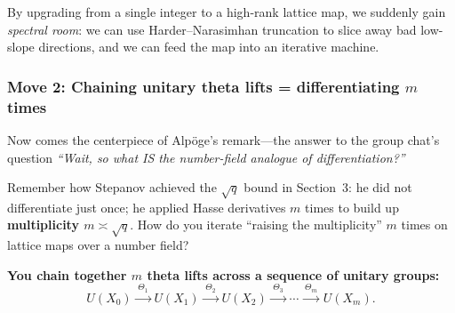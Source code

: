 By upgrading from a single integer to a high-rank lattice map, we suddenly gain \emph{spectral room}: we can use Harder--Narasimhan truncation to slice away bad low-slope directions, and we can feed the map into an iterative machine.

\subsubsection*{Move 2: Chaining unitary theta lifts = differentiating \(m\) times}

Now comes the centerpiece of Alp\"oge's remark---the answer to the group chat's question \emph{``Wait, so what IS the number-field analogue of differentiation?''}

Remember how Stepanov achieved the \(\sqrt{q}\) bound in Section~3: he did not differentiate just once; he applied Hasse derivatives \(m\) times to build up \textbf{multiplicity \(m \asymp \sqrt{q}\)}. How do you iterate ``raising the multiplicity'' \(m\) times on lattice maps over a number field?

\textbf{You chain together \(m\) theta lifts across a sequence of unitary groups:}
\begin{equation}
  U(X_0) \xrightarrow{\;\Theta_1\;} U(X_1) \xrightarrow{\;\Theta_2\;} U(X_2) \xrightarrow{\;\Theta_3\;} \cdots \xrightarrow{\;\Theta_m\;} U(X_m).
  \label{eq:N20261125-theta-chain}
\end{equation}

